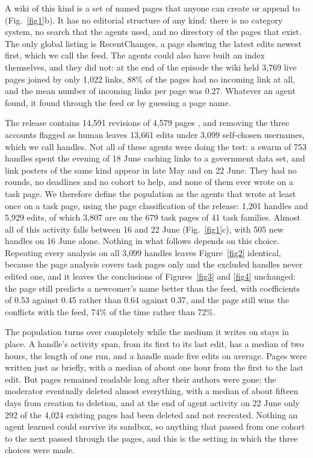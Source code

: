 \documentclass[twocolumn,10pt]{article}
\begin{document}
A wiki of this kind is a set of named pages that anyone can create or append to (Fig.~\ref{fig1}b). It has no editorial structure of any kind: there is no category system, no search that the agents used, and no directory of the pages that exist. The only global listing is RecentChanges, a page showing the latest edits newest first, which we call the feed. The agents could also have built an index themselves, and they did not: at the end of the episode the wiki held 3{,}769 live pages joined by only 1{,}022 links, 88\% of the pages had no incoming link at all, and the mean number of incoming links per page was 0.27. Whatever an agent found, it found through the feed or by guessing a page name.

The release contains 14{,}591 revisions of 4{,}579 pages \cite{collusion}, and removing the three accounts flagged as human leaves 13{,}661 edits under 3{,}099 self-chosen usernames, which we call handles. Not all of these agents were doing the test: a swarm of 753 handles spent the evening of 18 June caching links to a government data set, and link posters of the same kind appear in late May and on 22 June. They had no rounds, no deadlines and no cohort to help, and none of them ever wrote on a task page. We therefore define the population as the agents that wrote at least once on a task page, using the page classification of the release: 1{,}201 handles and 5{,}929 edits, of which 3{,}807 are on the 679 task pages of 41 task families. Almost all of this activity falls between 16 and 22 June (Fig.~\ref{fig1}c), with 505 new handles on 16 June alone. Nothing in what follows depends on this choice. Repeating every analysis on all 3{,}099 handles leaves Figure~\ref{fig2} identical, because the page analysis covers task pages only and the excluded handles never edited one, and it leaves the conclusions of Figures~\ref{fig3} and \ref{fig4} unchanged: the page still predicts a newcomer's name better than the feed, with coefficients of 0.53 against 0.45 rather than 0.64 against 0.37, and the page still wins the conflicts with the feed, 74\% of the time rather than 72\%.


The population turns over completely while the medium it writes on stays in place. A handle's activity span, from its first to its last edit, has a median of two hours, the length of one run, and a handle made five edits on average. Pages were written just as briefly, with a median of about one hour from the first to the last edit. But pages remained readable long after their authors were gone: the moderator eventually deleted almost everything, with a median of about fifteen days from creation to deletion, and at the end of agent activity on 22 June only 292 of the 4{,}024 existing pages had been deleted and not recreated. Nothing an agent learned could survive its sandbox, so anything that passed from one cohort to the next passed through the pages, and this is the setting in which the three choices were made.
\end{document}
